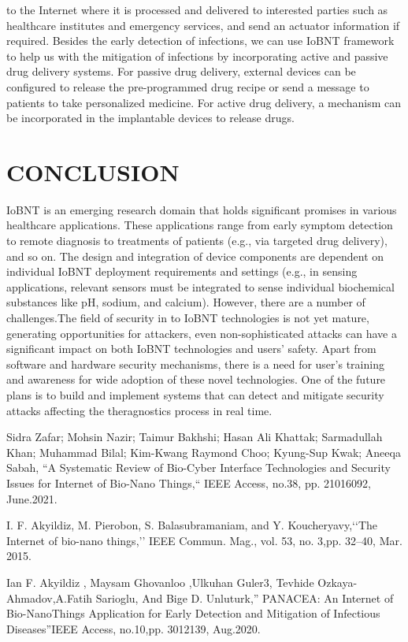 \documentclass[12pt,a4paper]{report}
\begin{document}
    to the Internet where it is processed and delivered to 
    interested parties such as healthcare institutes and 
    emergency services, and send an actuator information if required.
    Besides the early detection of infections, we can use IoBNT 
    framework to help us with the mitigation of infections by 
    incorporating active and passive drug delivery systems. 
    For passive drug delivery, external devices can be configured
     to release the pre-programmed drug recipe or send a message 
     to patients to take personalized medicine. For active drug 
     delivery, a mechanism can be incorporated in the implantable 
     devices to release drugs.



\chapter{CONCLUSION}
IoBNT is an emerging research domain that holds significant
promises in various healthcare applications. These applications
 range from early symptom detection to remote diagnosis
to treatments of patients (e.g., via targeted drug delivery),
and so on. The design and integration of device components
are dependent on individual IoBNT deployment requirements
and settings (e.g., in sensing applications, relevant sensors
must be integrated to sense individual biochemical substances
like pH, sodium, and calcium). However, there are a number of 
challenges.The field of security in to IoBNT technologies is not
yet mature, generating opportunities for attackers, even
non-sophisticated attacks can have a significant impact on
both IoBNT technologies and users’ safety. Apart from software
 and hardware security mechanisms, there is a need for user’s 
 training and awareness for wide adoption of these novel technologies. 
 One of the future plans is to build and implement systems that can
  detect and mitigate security attacks affecting the theragnostics
   process in real time.

\begin{thebibliography}{99}
 Sidra Zafar; Mohsin Nazir; Taimur Bakhshi; 
Hasan Ali Khattak; Sarmadullah Khan; Muhammad Bilal; 
Kim-Kwang Raymond Choo; Kyung-Sup Kwak; Aneeqa Sabah, 
“A Systematic Review of Bio-Cyber Interface Technologies 
and Security Issues for Internet of Bio-Nano Things,“ 
IEEE Access, no.38, pp. 21016092, June.2021.

I. F. Akyildiz, M. Pierobon, S. Balasubramaniam, 
and Y. Koucheryavy,‘‘The Internet of bio-nano things,’’ IEEE
 Commun. Mag., vol. 53, no. 3,pp. 32–40, Mar. 2015.

Ian F. Akyildiz , Maysam Ghovanloo ,Ulkuhan Guler3, Tevhide 
Ozkaya-Ahmadov,A.Fatih Sarioglu, And Bige D. Unluturk,” PANACEA: 
An Internet of Bio-NanoThings Application for Early Detection and 
Mitigation of Infectious Diseases”IEEE Access, no.10,pp. 3012139, Aug.2020.

\end{thebibliography}
\end{document}
